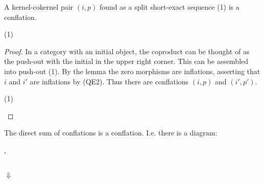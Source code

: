     \begin{corollary}
        A kernel-cokernel pair $(i,p)$ found as a split short-exact sequence (1) is a conflation. 
        
        \begin{center}
            (1)
        \end{center}
    \end{corollary}

    \begin{proof}
        In a category with an initial object, the coproduct can be thought of as the push-out with the initial in the upper right corner. This can be assembled into push-out (1).
        By the lemma the zero morphisms are inflations, asserting that $i$ and $i'$ are inflations by (QE2). Thus there are conflations $(i,p)$ and $(i',p')$.

        \begin{center}
            (1)
        \end{center}
    \end{proof}

    \begin{corollary}
        The direct sum of conflations is a conflation. I.e. there is a diagram:
        \begin{center}
            , 
             \\
            $\Downarrow$ \\
        \end{center}
    \end{corollary}

